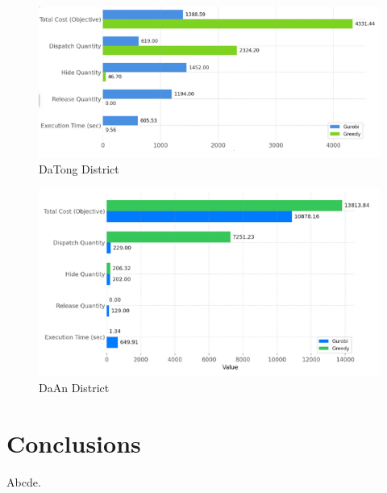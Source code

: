 \documentclass[11pt,a4paper]{article}
\begin{document}
\begin{figure}[H]
\centering
\includegraphics[width=textwidth]{Datong.png}
\caption{DaTong District}
\label{Figure 3}
\end{figure}

\begin{figure}[H]
\centering
\includegraphics[width=textwidth]{Daan.png}
\caption{DaAn District}
\label{Figure 4}
\end{figure}

\section{Conclusions}

Abcde.

\vspace{0.5em}
\end{document}
